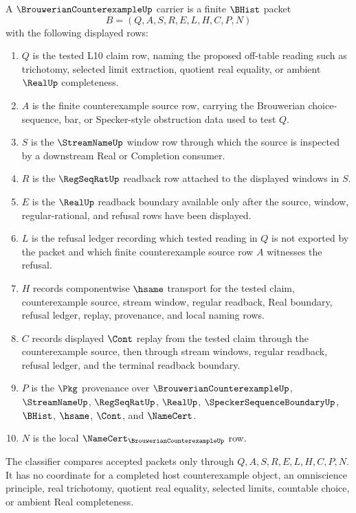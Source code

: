 \begin{definition}\label{def:brouwerian-counterexample-carrier}
A $\BrouwerianCounterexampleUp$ carrier is a finite $\BHist$ packet
$$
B=(Q,A,S,R,E,L,H,C,P,N)
$$
with the following displayed rows:
\begin{enumerate}
\item $Q$ is the tested L10 claim row, naming the proposed off-table reading such as trichotomy, selected limit extraction, quotient real equality, or ambient $\RealUp$ completeness.
\item $A$ is the finite counterexample source row, carrying the Brouwerian choice-sequence, bar, or Specker-style obstruction data used to test $Q$.
\item $S$ is the $\StreamNameUp$ window row through which the source is inspected by a downstream Real or Completion consumer.
\item $R$ is the $\RegSeqRatUp$ readback row attached to the displayed windows in $S$.
\item $E$ is the $\RealUp$ readback boundary available only after the source, window, regular-rational, and refusal rows have been displayed.
\item $L$ is the refusal ledger recording which tested reading in $Q$ is not exported by the packet and which finite counterexample source row $A$ witnesses the refusal.
\item $H$ records componentwise $\hsame$ transport for the tested claim, counterexample source, stream window, regular readback, Real boundary, refusal ledger, replay, provenance, and local naming rows.
\item $C$ records displayed $\Cont$ replay from the tested claim through the counterexample source, then through stream windows, regular readback, refusal ledger, and the terminal readback boundary.
\item $P$ is the $\Pkg$ provenance over $\BrouwerianCounterexampleUp$, $\StreamNameUp$, $\RegSeqRatUp$, $\RealUp$, $\SpeckerSequenceBoundaryUp$, $\BHist$, $\hsame$, $\Cont$, and $\NameCert$.
\item $N$ is the local $\NameCert_{\BrouwerianCounterexampleUp}$ row.
\end{enumerate}
The classifier compares accepted packets only through $Q,A,S,R,E,L,H,C,P,N$. It has no coordinate for a completed host counterexample object, an omniscience principle, real trichotomy, quotient real equality, selected limits, countable choice, or ambient Real completeness.
\end{definition}

